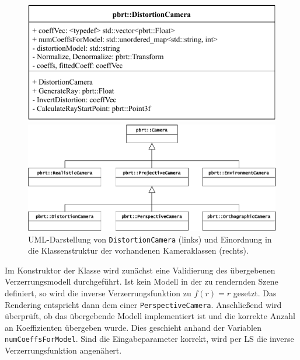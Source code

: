 \begin{figure}[h]
	\begin{minipage}{.5\textwidth}
		\centering
		\includegraphics[height=.4\columnwidth]{uml_distortioncam}
	\end{minipage}
	\begin{minipage}{.5\textwidth}
		\centering
		\includegraphics[height=.4\columnwidth]{uml_classes}
	\end{minipage}
	\caption{UML-Darstellung von \texttt{DistortionCamera} (links) und Einordnung in die Klassenstruktur der vorhandenen Kameraklassen (rechts).}
	\label{fig:uml}
\end{figure}

Im Konstruktor der Klasse wird zunächst eine Validierung des übergebenen Verzerrungsmodell durchgeführt. Ist kein Modell in der zu rendernden Szene definiert, so wird die inverse Verzerrungsfunktion zu $f(r) = r$ gesetzt. Das Rendering entspricht dann dem einer \texttt{PerspectiveCamera}. Anschließend wird überprüft, ob das übergebende Modell implementiert ist und die korrekte Anzahl an Koeffizienten übergeben wurde. Dies geschieht anhand der Variablen \texttt{numCoeffsForModel}. Sind die Eingabeparameter korrekt, wird per LS die inverse Verzerrungsfunktion angenähert.


